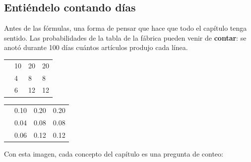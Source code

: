 \subsection{Entiéndelo contando días}

Antes de las fórmulas, una forma de pensar que hace que todo el capítulo tenga sentido. Las probabilidades de la tabla
de la fábrica pueden venir de \textbf{contar}: se anotó durante 100 días cuántos artículos produjo cada línea.

\begin{center}\small
{}
\begin{tabular}{|Q|Q|Q|Q|}\hline
{} &  &  & \\\hline
{} & 10 & 20 & 20\\\hline
{} & 4 & 8 & 8\\\hline
{} & 6 & 12 & 12\\\hline
\end{tabular}
\quad{}\quad
\begin{tabular}{|Q|Q|Q|Q|}\hline
\hd{$\fxy$} &  &  & \\\hline
{} & 0.10 & 0.20 & 0.20\\\hline
{} & 0.04 & 0.08 & 0.08\\\hline
{} & 0.06 & 0.12 & 0.12\\\hline
\end{tabular}
\end{center}


Con esta imagen, cada concepto del capítulo es una pregunta de conteo:

